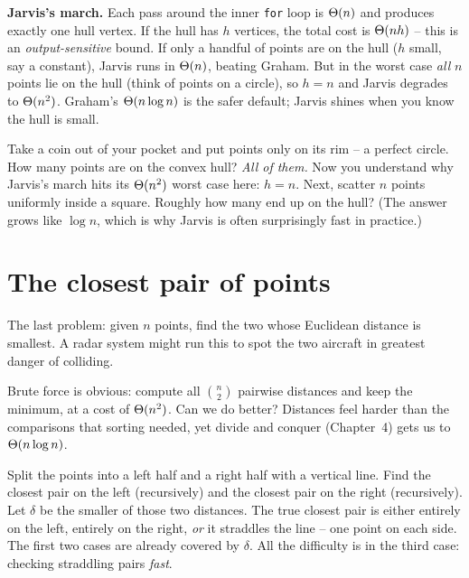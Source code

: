 \begin{complexitybox}
\textbf{Jarvis's march.} Each pass around the inner \texttt{for} loop is $\Theta(n)$
and produces exactly one hull vertex. If the hull has $h$ vertices, the total cost
is $\Theta(nh)$ -- this is an \emph{output-sensitive} bound. If only a handful of
points are on the hull ($h$ small, say a constant), Jarvis runs in $\Theta(n)$,
beating Graham. But in the worst case \emph{all} $n$ points lie on the hull (think
of points on a circle), so $h = n$ and Jarvis degrades to $\Theta(n^2)$. Graham's
$\Theta(n \log n)$ is the safer default; Jarvis shines when you know the hull is
small.
\end{complexitybox}

\begin{walkbox}
Take a coin out of your pocket and put points only on its rim -- a perfect circle.
How many points are on the convex hull? \emph{All of them.} Now you understand
why Jarvis's march hits its $\Theta(n^2)$ worst case here: $h = n$. Next, scatter $n$
points uniformly inside a square. Roughly how many end up on the hull? (The answer
grows like $\log n$, which is why Jarvis is often surprisingly fast in practice.)
\end{walkbox}

\section{The closest pair of points}

The last problem: given $n$ points, find the two whose Euclidean distance is
smallest. A radar system might run this to spot the
two aircraft in greatest danger of colliding.

Brute force is obvious: compute all $\binom{n}{2}$ pairwise distances and keep the
minimum, at a cost of $\Theta(n^2)$. Can we do better? Distances feel harder than
the comparisons that sorting needed, yet divide and conquer (Chapter~4) gets us
to $\Theta(n \log n)$.

\begin{intuitionbox}
Split the points into a left half and a right half with a vertical line. Find the
closest pair on the left (recursively) and the closest pair on the right
(recursively). Let $\delta$ be the smaller of those two distances. The true
closest pair is either entirely on the left, entirely on the right, \emph{or} it
straddles the line -- one point on each side. The first two cases are already
covered by $\delta$. All the difficulty is in the third case: checking straddling
pairs \emph{fast}.
\end{intuitionbox}

